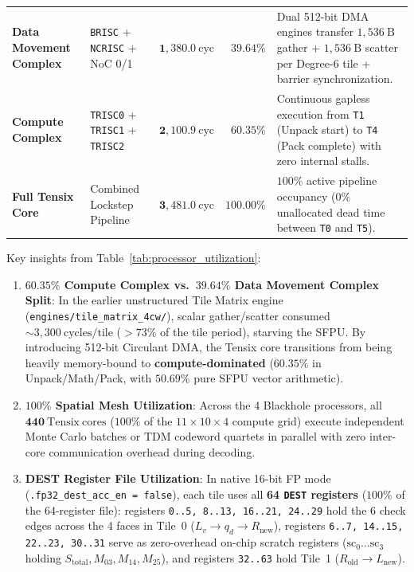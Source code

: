 \documentclass[10pt]{article}
\begin{document}
\begin{table}[!htbp]
{\begin{tabular}{@{}l l r r p{7.6cm}@{}}
\midrule
\textbf{Data Movement Complex} & \texttt{BRISC} + \texttt{NCRISC} + NoC 0/1 & $\mathbf{1,380.0\ \mathrm{cyc}}$ & $\mathbf{39.64\%}$ & Dual 512-bit DMA engines transfer $1,536\ \mathrm{B}$ gather + $1,536\ \mathrm{B}$ scatter per Degree-6 tile + barrier synchronization. \\
\textbf{Compute Complex} & \texttt{TRISC0} + \texttt{TRISC1} + \texttt{TRISC2} & $\mathbf{2,100.9\ \mathrm{cyc}}$ & $\mathbf{60.35\%}$ & Continuous gapless execution from \texttt{T1} (Unpack start) to \texttt{T4} (Pack complete) with zero internal stalls. \\
\textbf{Full Tensix Core} & Combined Lockstep Pipeline & $\mathbf{3,481.0\ \mathrm{cyc}}$ & $\mathbf{100.00\%}$ & $100\%$ active pipeline occupancy ($0\%$ unallocated dead time between \texttt{T0} and \texttt{T5}). \\
\bottomrule
\end{tabular}%
}
\end{table}

Key insights from Table~\ref{tab:processor_utilization}:
\begin{enumerate}[leftmargin=1.8em, itemsep=2pt]
    \item \textbf{$60.35\%$ Compute Complex vs.\ $39.64\%$ Data Movement Complex Split}: In the earlier unstructured Tile Matrix engine (\texttt{engines/tile\_matrix\_4cw/}), scalar gather/scatter consumed $\sim 3,300\ \mathrm{cycles/tile}$ ($>73\%$ of the tile period), starving the SFPU. By introducing 512-bit Circulant DMA, the Tensix core transitions from being heavily memory-bound to \textbf{compute-dominated} ($60.35\%$ in Unpack/Math/Pack, with $50.69\%$ pure SFPU vector arithmetic).
    \item \textbf{$100\%$ Spatial Mesh Utilization}: Across the 4 Blackhole processors, all $\mathbf{440\ \mathrm{Tensix\ cores}}$ ($100\%$ of the $11 \times 10 \times 4$ compute grid) execute independent Monte Carlo batches or TDM codeword quartets in parallel with zero inter-core communication overhead during decoding.
    \item \textbf{DEST Register File Utilization}: In native 16-bit FP mode (\texttt{.fp32\_dest\_acc\_en = false}), each tile uses all \textbf{64 \texttt{DEST} registers} ($100\%$ of the 64-register file): registers \texttt{0..5, 8..13, 16..21, 24..29} hold the 6 check edges across the 4 faces in Tile~0 ($L_v \to q_d \to R_{\mathrm{new}}$), registers \texttt{6..7, 14..15, 22..23, 30..31} serve as zero-overhead on-chip scratch registers ($\mathrm{sc}_0 \dots \mathrm{sc}_3$ holding $S_{\mathrm{total}}, M_{03}, M_{14}, M_{25}$), and registers \texttt{32..63} hold Tile~1 ($R_{\mathrm{old}} \to L_{\mathrm{new}}$).
\end{enumerate}
\end{document}

